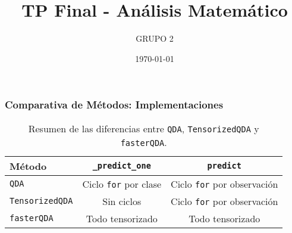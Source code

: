 \documentclass{beamer}
\title{TP Final - Análisis Matemático}
\author{GRUPO 2}
\date{\today}
\begin{document}


    
\begin{frame}
  \frametitle{Comparativa de Métodos: Implementaciones}

  \begin{table}[h!]
    \centering
    \begin{tabular}{@{}lcc@{}}
      \toprule
      \textbf{Método}       & \texttt{\_predict\_one}                    & \texttt{predict}                      \\ 
      \midrule
      \texttt{QDA}          & Ciclo \texttt{for} por clase              & Ciclo \texttt{for} por observación    \\ 
      \texttt{TensorizedQDA}& Sin ciclos                                & Ciclo \texttt{for} por observación    \\ 
      \texttt{fasterQDA}    & Todo tensorizado                          & Todo tensorizado                      \\ 
      \bottomrule
    \end{tabular}
    \caption{Resumen de las diferencias entre \texttt{QDA}, \texttt{TensorizedQDA} y \texttt{fasterQDA}.}
  \end{table}

\end{frame}
\end{document}
